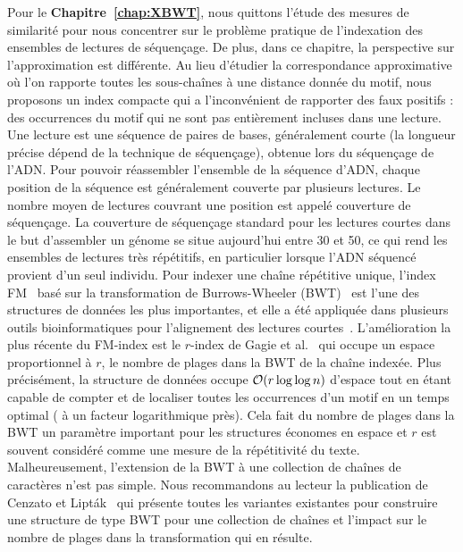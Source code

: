 Pour le \textbf{Chapitre~\ref{chap:XBWT}}, nous quittons l'étude des mesures de similarité pour nous concentrer sur le problème pratique de l'indexation des ensembles de lectures de séquençage. 
De plus, dans ce chapitre, la perspective sur l'approximation est différente. Au lieu d'étudier la correspondance approximative où l'on rapporte toutes les sous-chaînes à une distance donnée du motif, nous proposons un index compacte qui a l'inconvénient de rapporter des faux positifs : des occurrences du motif qui ne sont pas entièrement incluses dans une lecture.
%
Une lecture est une séquence de paires de bases, généralement courte (la longueur précise dépend de la technique de séquençage), obtenue lors du séquençage de l'ADN. Pour pouvoir réassembler l'ensemble de la séquence d'ADN, chaque position de la séquence est généralement couverte par plusieurs lectures. Le nombre moyen de lectures couvrant une position est appelé couverture de séquençage.
La couverture de séquençage standard pour les lectures courtes dans le but d'assembler un génome se situe aujourd'hui entre 30 et 50, ce qui rend les ensembles de lectures très répétitifs, en particulier lorsque l'ADN séquencé provient d'un seul individu.
%
Pour indexer une chaîne répétitive unique, l'index FM~\cite{ferragina2005indexing} basé sur la transformation de Burrows-Wheeler (BWT)~\cite{burrows1994block} est l'une des structures de données les plus importantes, et elle a été appliquée dans plusieurs outils bioinformatiques pour l'alignement des lectures courtes~\cite{langmead2009ultrafast,langmead2012fast,li2009fast}.
%
L'amélioration la plus récente du FM-index est le $r$-index de Gagie et al.~\cite{gagie2020fully} qui occupe un espace proportionnel à $r$, le nombre de plages dans la BWT de la chaîne indexée. Plus précisément, la structure de données occupe $\mathcal{O}(r\log\log n)$ d'espace tout en étant capable de compter et de localiser toutes les occurrences d'un motif en un temps optimal ( à un facteur logarithmique près). Cela fait du nombre de plages dans la BWT un paramètre important pour les structures économes en espace et $r$ est souvent considéré comme une mesure de la répétitivité du texte.
%
Malheureusement, l'extension de la BWT à une collection de chaînes de caractères n'est pas simple. Nous recommandons au lecteur la publication de Cenzato et Lipták~\cite{cenzato_et_al_BWT_Collections} qui présente toutes les variantes existantes pour construire une structure de type BWT pour une collection de chaînes et l'impact sur le nombre de plages dans la transformation qui en résulte.

